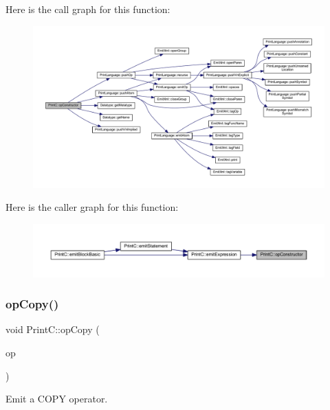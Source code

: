 Here is the call graph for this function\+:
\nopagebreak
\begin{figure}[H]
\begin{center}
\leavevmode
\includegraphics[width=350pt]{class_print_c_aee706d2e639807a35d0a1c161f3da137_cgraph}
\end{center}
\end{figure}
Here is the caller graph for this function\+:
\nopagebreak
\begin{figure}[H]
\begin{center}
\leavevmode
\includegraphics[width=350pt]{class_print_c_aee706d2e639807a35d0a1c161f3da137_icgraph}
\end{center}
\end{figure}
\mbox{\label{class_print_c_a60fa8313562ee222929335f6dd5d0183}} 
\subsubsection{\texorpdfstring{opCopy()}{opCopy()}}
{\footnotesize\ttfamily void Print\+C\+::op\+Copy (\begin{DoxyParamCaption}\item[{const \mbox{\hyperlink{class_pcode_op}{Pcode\+Op}} $\ast$}]{op }\end{DoxyParamCaption})\hspace{0.3cm}{\ttfamily [virtual]}}



Emit a C\+O\+PY operator. 



